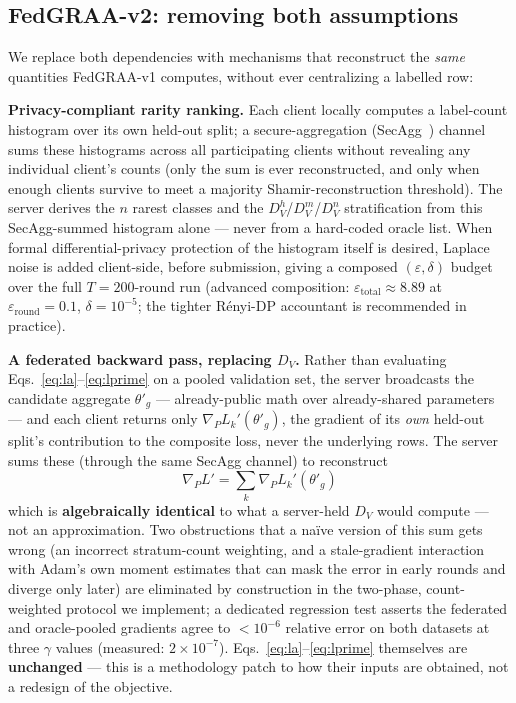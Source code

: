 \documentclass{llncs}
\begin{document}
\subsection{FedGRAA-v2: removing both assumptions}

We replace both dependencies with mechanisms that reconstruct the \emph{same} quantities FedGRAA-v1 computes, without ever centralizing a labelled row:

\textbf{Privacy-compliant rarity ranking.} Each client locally computes a label-count histogram over its own held-out split; a secure-aggregation (SecAgg~\cite{Bonawitz2016}) channel sums these histograms across all participating clients without revealing any individual client's counts (only the sum is ever reconstructed, and only when enough clients survive to meet a majority Shamir-reconstruction threshold). The server derives the $n$ rarest classes and the $D_V^h$/$D_V^m$/$D_V^n$ stratification from this SecAgg-summed histogram alone --- never from a hard-coded oracle list. When formal differential-privacy protection of the histogram itself is desired, Laplace noise is added client-side, before submission, giving a composed $(\varepsilon,\delta)$ budget over the full $T=200$-round run (advanced composition: $\varepsilon_{\text{total}} \approx 8.89$ at $\varepsilon_{\text{round}}=0.1$, $\delta=10^{-5}$; the tighter R\'enyi-DP accountant is recommended in practice).

\textbf{A federated backward pass, replacing $D_V$.} Rather than evaluating Eqs.~\eqref{eq:la}--\eqref{eq:lprime} on a pooled validation set, the server broadcasts the candidate aggregate $\theta'_g$ --- already-public math over already-shared parameters --- and each client returns only $\nabla_P L_k'(\theta'_g)$, the gradient of its \emph{own} held-out split's contribution to the composite loss, never the underlying rows. The server sums these (through the same SecAgg channel) to reconstruct
\begin{equation}
\nabla_P L' = \sum_k \nabla_P L_k'(\theta'_g)
\label{eq:federated-grad}
\end{equation}
which is \textbf{algebraically identical} to what a server-held $D_V$ would compute --- not an approximation. Two obstructions that a na\"{i}ve version of this sum gets wrong (an incorrect stratum-count weighting, and a stale-gradient interaction with Adam's own moment estimates that can mask the error in early rounds and diverge only later) are eliminated by construction in the two-phase, count-weighted protocol we implement; a dedicated regression test asserts the federated and oracle-pooled gradients agree to $<10^{-6}$ relative error on both datasets at three $\gamma$ values (measured: $2\times10^{-7}$). Eqs.~\eqref{eq:la}--\eqref{eq:lprime} themselves are \textbf{unchanged} --- this is a methodology patch to how their inputs are obtained, not a redesign of the objective.
\end{document}
